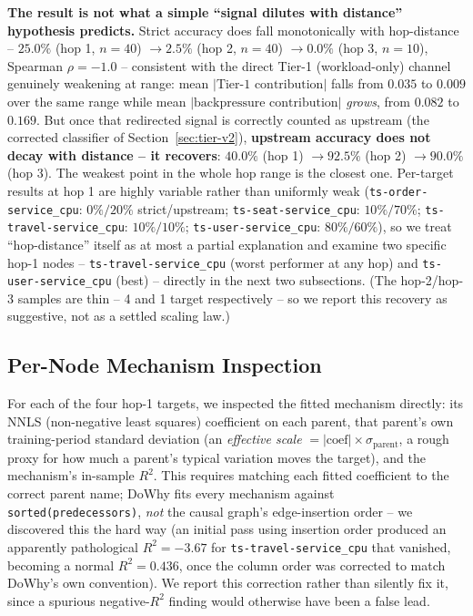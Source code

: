\documentclass[journal, 10pt]{IEEEtran}
\begin{document}
\textbf{The result is not what a simple ``signal dilutes with distance'' hypothesis predicts.} Strict accuracy does fall monotonically with hop-distance -- $25.0\%$ (hop 1, $n{=}40$) $\to 2.5\%$ (hop 2, $n{=}40$) $\to 0.0\%$ (hop 3, $n{=}10$), Spearman $\rho=-1.0$ -- consistent with the direct Tier-1 (workload-only) channel genuinely weakening at range: mean $|{\text{Tier-1 contribution}}|$ falls from $0.035$ to $0.009$ over the same range while mean $|{\text{backpressure contribution}}|$ \emph{grows}, from $0.082$ to $0.169$. But once that redirected signal is correctly counted as upstream (the corrected classifier of Section~\ref{sec:tier-v2}), \textbf{upstream accuracy does not decay with distance -- it recovers}: $40.0\%$ (hop 1) $\to 92.5\%$ (hop 2) $\to 90.0\%$ (hop 3). The weakest point in the whole hop range is the closest one. Per-target results at hop 1 are highly variable rather than uniformly weak (\texttt{ts-order-service\_cpu}: $0\%/20\%$ strict/upstream; \texttt{ts-seat-service\_cpu}: $10\%/70\%$; \texttt{ts-travel-service\_cpu}: $10\%/10\%$; \texttt{ts-user-service\_cpu}: $80\%/60\%$), so we treat ``hop-distance'' itself as at most a partial explanation and examine two specific hop-1 nodes -- \texttt{ts-travel-service\_cpu} (worst performer at any hop) and \texttt{ts-user-service\_cpu} (best) -- directly in the next two subsections. (The hop-2/hop-3 samples are thin -- 4 and 1 target respectively -- so we report this recovery as suggestive, not as a settled scaling law.)

\subsection{Per-Node Mechanism Inspection}
\label{sec:mechanism}
For each of the four hop-1 targets, we inspected the fitted mechanism directly: its NNLS (non-negative least squares) coefficient on each parent, that parent's own training-period standard deviation (an \emph{effective scale} $= |\text{coef}| \times \sigma_{\text{parent}}$, a rough proxy for how much a parent's typical variation moves the target), and the mechanism's in-sample $R^2$. This requires matching each fitted coefficient to the correct parent name; DoWhy fits every mechanism against \texttt{sorted(predecessors)}, \emph{not} the causal graph's edge-insertion order -- we discovered this the hard way (an initial pass using insertion order produced an apparently pathological $R^2=-3.67$ for \texttt{ts-travel-service\_cpu} that vanished, becoming a normal $R^2=0.436$, once the column order was corrected to match DoWhy's own convention). We report this correction rather than silently fix it, since a spurious negative-$R^2$ finding would otherwise have been a false lead.
\end{document}
